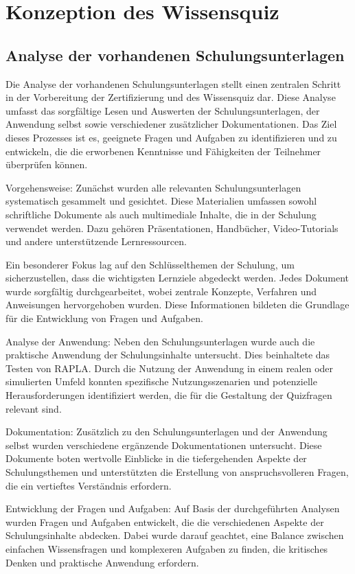 \chapter{Konzeption des Wissensquiz}
\section{Analyse der vorhandenen Schulungsunterlagen}
Die Analyse der vorhandenen Schulungsunterlagen stellt einen zentralen Schritt in der Vorbereitung der Zertifizierung und des Wissensquiz dar. Diese Analyse umfasst das sorgfältige Lesen und Auswerten der Schulungsunterlagen, der Anwendung selbst sowie verschiedener zusätzlicher Dokumentationen. Das Ziel dieses Prozesses ist es, geeignete Fragen und Aufgaben zu identifizieren und zu entwickeln, die die erworbenen Kenntnisse und Fähigkeiten der Teilnehmer überprüfen können.


Vorgehensweise:
Zunächst wurden alle relevanten Schulungsunterlagen systematisch gesammelt und gesichtet. Diese Materialien umfassen sowohl schriftliche Dokumente als auch multimediale Inhalte, die in der Schulung verwendet werden. Dazu gehören Präsentationen, Handbücher, Video-Tutorials und andere unterstützende Lernressourcen.

Ein besonderer Fokus lag auf den Schlüsselthemen der Schulung, um sicherzustellen, dass die wichtigsten Lernziele abgedeckt werden. Jedes Dokument wurde sorgfältig durchgearbeitet, wobei zentrale Konzepte, Verfahren und Anweisungen hervorgehoben wurden. Diese Informationen bildeten die Grundlage für die Entwicklung von Fragen und Aufgaben.

Analyse der Anwendung:
Neben den Schulungsunterlagen wurde auch die praktische Anwendung der Schulungsinhalte untersucht. Dies beinhaltete das Testen von RAPLA. Durch die Nutzung der Anwendung in einem realen oder simulierten Umfeld konnten spezifische Nutzungsszenarien und potenzielle Herausforderungen identifiziert werden, die für die Gestaltung der Quizfragen relevant sind.

Dokumentation:
Zusätzlich zu den Schulungsunterlagen und der Anwendung selbst wurden verschiedene ergänzende Dokumentationen untersucht. Diese Dokumente boten wertvolle Einblicke in die tiefergehenden Aspekte der Schulungsthemen und unterstützten die Erstellung von anspruchsvolleren Fragen, die ein vertieftes Verständnis erfordern.

Entwicklung der Fragen und Aufgaben:
Auf Basis der durchgeführten Analysen wurden Fragen und Aufgaben entwickelt, die die verschiedenen Aspekte der Schulungsinhalte abdecken. Dabei wurde darauf geachtet, eine Balance zwischen einfachen Wissensfragen und komplexeren Aufgaben zu finden, die kritisches Denken und praktische Anwendung erfordern.

